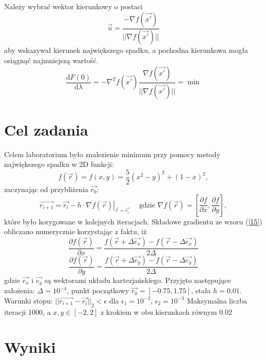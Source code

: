 \documentclass{article}
\begin{document}
Należy wybrać wektor kierunkowy o postaci
\begin{equation}
\vec{u} = \frac{- \nabla f(\vec{x'})}{||\nabla f(\vec{x'})||}
\end{equation}
aby wskazywał kierunek największego spadku, a pochodna kierunkowa mogła osiągnąć najmniejszą wartość.
\begin{equation}
\frac{\text{d} F(0) }{\text{d} \lambda} = - \nabla^T f(\vec{x'})  \frac{\nabla f(\vec{x'})}{||\nabla f(\vec{x'})||} = \min
\end{equation}

\section{Cel zadania}

Celem laboratorium było znalezienie minimum przy pomocy metody największego spadku w 2D funkcji:
\begin{equation}
f(\vec{r}) =  f(x, y) = \frac{5}{2} (x^2 - y)^2 + (1 - x )^2,
\label{lol}
\end{equation}
zaczynając od przybliżenia $\vec{r_0}$:
\begin{equation}
\vec{r_{i+1}} = \vec{r_i} - h\cdot\nabla \left.f(\vec{r})\right|_{\vec{r} = \vec{r_i}} \quad \text{ gdzie } \nabla f(\vec{r}) = \left[\frac{\partial f}{\partial x}, \frac{\partial f}{\partial y}\right],
\label{15}
\end{equation}
które było korygowane w kolejnych iteracjach.
Składowe gradientu ze wzoru (\ref{15}) obliczano numerycznie korzystając z faktu, iż
\begin{equation}
\frac{\partial f(\vec{r})}{\partial  x} = \frac{f(\vec{r} + \Delta \vec{e_x}) - f(\vec{r} - \Delta \vec{e_x})}{2 \Delta}
\end{equation}
\begin{equation}
\frac{\partial f(\vec{r})}{\partial  y} = \frac{f(\vec{r} + \Delta \vec{e_y}) - f(\vec{r} - \Delta \vec{e_y})}{2 \Delta}
\end{equation}
gdzie $\vec{e_x}$ i $\vec{e_y}$ są wektorami układu kartezjańskiego.
Przyjęto następujące założenia:
$\Delta = 10^{-4}$, punkt początkowy $\vec{r_0} = [-0.75, 1.75]$, stała $h = 0.01$. Warunki stopu:
$||\vec{r_{i+1}} - \vec{r_i}||_2 < \epsilon$ dla $\epsilon_1 = 10^{-2}$, $\epsilon_2 = 10^{-3}$
Maksymalna liczba iteracji 1000, a 
$x, y \in [-2, 2]$ z krokiem w obu kierunkach równym 0.02
\newpage
\section{Wyniki}
\end{document}
